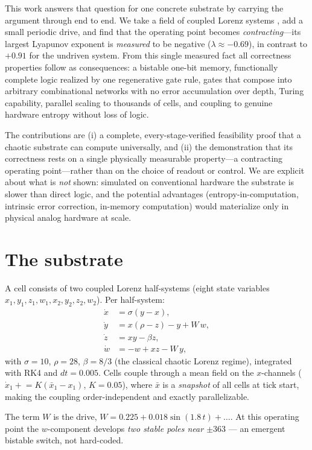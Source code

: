 \documentclass[11pt]{article}
\begin{document}
This work answers that question for one concrete substrate by carrying the argument through end to
end. We take a field of coupled Lorenz systems \cite{lorenz1963}, add a small periodic drive, and
find that the operating point becomes \emph{contracting}---its largest Lyapunov exponent is
\emph{measured} to be negative ($\lambda\approx-0.69$), in contrast to $+0.91$ for the undriven
system. From this single measured fact all correctness properties follow as consequences: a
bistable one-bit memory, functionally complete logic realized by one regenerative gate rule, gates
that compose into arbitrary combinational networks with no error accumulation over depth, Turing
capability, parallel scaling to thousands of cells, and coupling to genuine hardware entropy without
loss of logic.

The contributions are (i) a complete, every-stage-verified feasibility proof that a chaotic
substrate can compute universally, and (ii) the demonstration that its correctness rests on a single
physically measurable property---a contracting operating point---rather than on the choice of readout
or control. We are explicit about what is \emph{not} shown: simulated on conventional hardware the
substrate is slower than direct logic, and the potential advantages (entropy-in-computation,
intrinsic error correction, in-memory computation) would materialize only in physical analog hardware
at scale.

\section{The substrate}
A cell consists of two coupled Lorenz half-systems (eight state variables
$x_1,y_1,z_1,w_1,x_2,y_2,z_2,w_2$). Per half-system:
\begin{align}
  \dot{x} &= \sigma(y-x), \nonumber\\
  \dot{y} &= x(\rho-z) - y + W\,w, \nonumber\\
  \dot{z} &= xy - \beta z, \nonumber\\
  \dot{w} &= -w + xz - W\,y,
\end{align}
with $\sigma=10$, $\rho=28$, $\beta=8/3$ (the classical chaotic Lorenz regime), integrated with
RK4 and $dt=0.005$. Cells couple through a mean field on the $x$-channels
($\dot{x}_1 \mathrel{+}= K(\bar{x}_1 - x_1)$, $K=0.05$), where $\bar{x}$ is a \emph{snapshot} of
all cells at tick start, making the coupling order-independent and exactly parallelizable.

The term $W$ is the drive,
$W = 0.225 + 0.018\sin(1.8\,t) + \dots$. At this operating point the $w$-component develops
\emph{two stable poles near $\pm 363$} --- an emergent bistable switch, not hard-coded.
\end{document}
